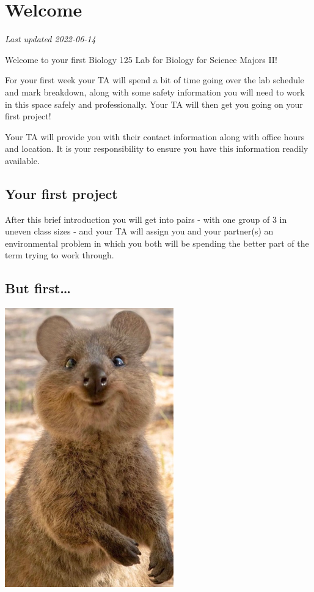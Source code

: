 \documentclass[
]{book}
\begin{document}
\hypertarget{welcome-1}{%
\chapter*{Welcome}\label{welcome-1}}

\emph{Last updated 2022-06-14}

Welcome to your first Biology 125 Lab for Biology for Science Majors II!

For your first week your TA will spend a bit of time going over the lab schedule and mark breakdown, along with some safety information you will need to work in this space safely and professionally. Your TA will then get you going on your first project!

Your TA will provide you with their contact information along with office hours and location. It is your responsibility to ensure you have this information readily available.

\hypertarget{your-first-project}{%
\section*{Your first project}\label{your-first-project}}

After this brief introduction you will get into pairs - with one group of 3 in uneven class sizes - and your TA will assign you and your partner(s) an environmental problem in which you both will be spending the better part of the term trying to work through.

\hypertarget{but-first}{%
\section*{But first\ldots{}}\label{but-first}}

\includegraphics{images/img-1.png}
\end{document}
